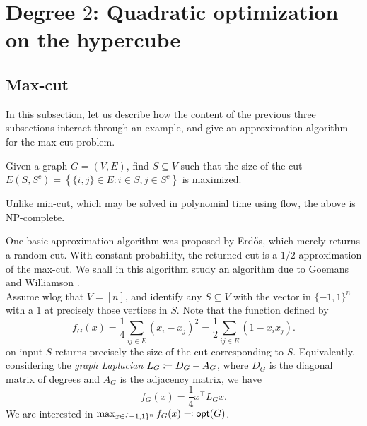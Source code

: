 
\clearpage

\section{Degree $2$: Quadratic optimization on the hypercube}
\label{sec:quad-optim}

\subsection{Max-cut}
\label{subsec:max-cut}

	In this subsection, let us describe how the content of the previous three subsections interact through an example, and give an approximation algorithm for the max-cut problem.

	\begin{question*}
		Given a graph $G = (V,E)$, find $S \subseteq V$ such that the size of the cut $E(S,S^c) = \left\{ \{i,j\} \in E : i \in S, j \in S^c \right\}$ is maximized.
	\end{question*}

	Unlike min-cut, which may be solved in polynomial time using flow, the above is \textsf{NP}-complete.

	One basic approximation algorithm was proposed by Erd\H{o}s, which merely returns a random cut. With constant probability, the returned cut is a $1/2$-approximation of the max-cut. We shall in this algorithm study an algorithm due to Goemans and Williamson \cite{gw-maxcut}.\\
	Assume wlog that $V = [n]$, and identify any $S \subseteq V$ with the vector in $\{-1,1\}^n$ with a $1$ at precisely those vertices in $S$. Note that the function defined by
	\begin{equation}
		\label{eqn: fg-def}
		f_G(x) = \frac{1}{4} \sum_{ij \in E} (x_i - x_j)^2 = \frac{1}{2} \sum_{ij \in E} (1 - x_ix_j).
	\end{equation}
	on input $S$ returns precisely the size of the cut corresponding to $S$. Equivalently, considering the \emph{graph Laplacian} $L_G \coloneqq D_G - A_G$, where $D_G$ is the diagonal matrix of degrees and $A_G$ is the adjacency matrix, we have
	\begin{equation}
		\label{eqn: gw-lapl}
		f_G(x) = \frac{1}{4} x^\top L_G x.
	\end{equation}
	We are interested in $\max_{x \in \{-1,1\}^n} f_G(x) \eqqcolon \mathsf{opt}(G)$.

